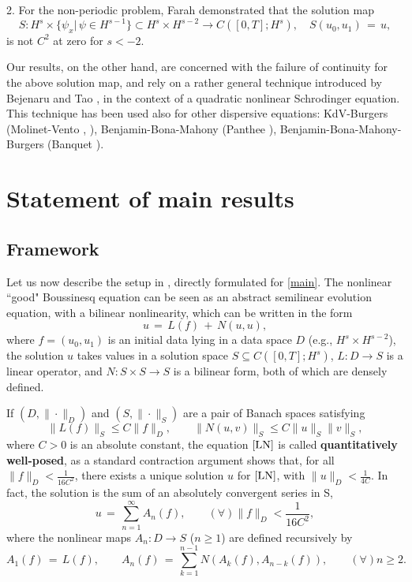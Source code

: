 \documentclass{amsart}
\begin{document}
2. For the non-periodic problem, Farah \cite{F09} demonstrated that the solution map 
\[
S: H^s\times \{\psi_x |\,\psi\in H^{s-1}\}\subset H^s\times H^{s-2} \to C([0,T]; H^s), \quad
S(u_0,u_1)\,=\,u,
\]
is not $C^2$ at zero for $s<-2$.


Our results, on the other hand, are concerned with the failure of continuity for the above solution map, and rely on a rather general technique introduced by Bejenaru and Tao \cite{BT06}, in the context of a quadratic nonlinear Schrodinger equation. This technique has been used also for other dispersive equations: KdV-Burgers (Molinet-Vento \cite{MV09}, \cite{MV10}), Benjamin-Bona-Mahony (Panthee \cite{P11}), Benjamin-Bona-Mahony-Burgers (Banquet \cite{B11}). 


\section{Statement of main results}

\subsection{Framework} Let us now describe the setup in \cite{BT06}, directly formulated for \eqref{main}. The nonlinear ``good" Boussinesq equation can be seen as an abstract semilinear evolution equation, with a bilinear nonlinearity, which can be written in the form 
\begin{equation}
u\,=\,L(f)\,+\,N(u,u),
\label{LN}
\end{equation}
where $f=(u_0, u_1)$ is an initial data lying in a data space $D$ (e.g., $H^s \times H^{s-2}$), the solution $u$ takes values in a solution space $S \subseteq	 C([0,T]; H^s)$, $L: D \to S$ is a linear operator, and $N:S\times S \to S$ is a bilinear form, both of which are densely defined.  

If  $(D,\|\cdot \|_D)$ and $(S,\|\cdot \|_S)$ are a pair of Banach spaces satisfying 
\begin{equation}
\|L(f)\|_S \leq C \|f\|_D,\qquad \|N(u,v)\|_S \leq C \|u\|_S \|v\|_S,
\label{estim}
\end{equation}
where $C>0$ is an absolute constant, the equation $\eqref{LN}$ is called \textbf{quantitatively well-posed}, as a standard contraction argument shows that, for all  $\|f\|_D<\frac{1}{16C^2}$, there exists a unique solution $u$ for $\eqref{LN}$, with $\|u\|_D<\frac{1}{4C}$. In fact, the solution is the sum of an absolutely convergent series in S, 
\begin{equation}
u\,=\,\sum_{n=1}^{\infty} A_n(f), \qquad (\forall) \|f\|_D<\frac{1}{16C^2},
\label{series}
\end{equation}
where the nonlinear maps $A_n: D\to S$ ($n\geq 1$) are defined recursively by
\begin{equation}
A_1(f)\,=\,L(f), \qquad A_n(f)\,=\,\sum_{k=1}^{n-1} N(A_k(f),A_{n-k}(f)), \qquad (\forall)n\geq 2.
\label{An}
\end{equation}
\end{document}
